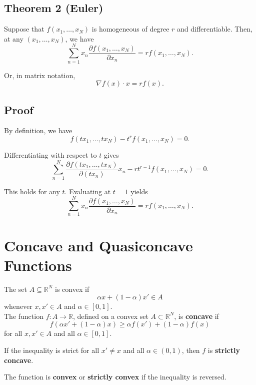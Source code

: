 \begin{tcolorbox}[breakable, colback=white]
\subsection*{Theorem 2 (Euler)}

Suppose that $f(x_1, \dots, x_N)$ is homogeneous of degree $r$ and differentiable.
Then, at any $(x_1, \dots, x_N)$, we have
\[
\sum_{n=1}^N x_n \frac{\partial f(x_1, \dots, x_N)}{\partial x_n}
= r f(x_1, \dots, x_N).
\]

Or, in matrix notation,
\[
\nabla f(x) \cdot x = r f(x).
\]

\subsection*{Proof}

By definition, we have
\[
f(t x_1, \dots, t x_N) - t^r f(x_1, \dots, x_N) = 0.
\]

Differentiating with respect to $t$ gives
\[
\sum_{n=1}^N \frac{\partial f(t x_1, \dots, t x_N)}{\partial (t x_n)} x_n
- r t^{r-1} f(x_1, \dots, x_N) = 0.
\]

This holds for any $t$. Evaluating at $t=1$ yields
\[
\sum_{n=1}^N x_n \frac{\partial f(x_1, \dots, x_N)}{\partial x_n}
= r f(x_1, \dots, x_N).
\]

\end{tcolorbox}

\section{Concave and Quasiconcave Functions}

The set $A \subseteq \mathbb{R}^N$ is convex if
\[
\alpha x + (1-\alpha)x' \in A
\]
whenever $x, x' \in A$ and $\alpha \in [0,1]$.\\


The function $f : A \to \mathbb{R}$, defined on a convex set $A \subset \mathbb{R}^N$,
is \textbf{concave} if
\[
f(\alpha x' + (1-\alpha)x) \ge \alpha f(x') + (1-\alpha) f(x)
\]
for all $x, x' \in A$ and all $\alpha \in [0,1]$.

If the inequality is strict for all $x' \neq x$ and all $\alpha \in (0,1)$,
then $f$ is \textbf{strictly concave}.

The function is \textbf{convex} or \textbf{strictly convex} if the inequality is reversed.


